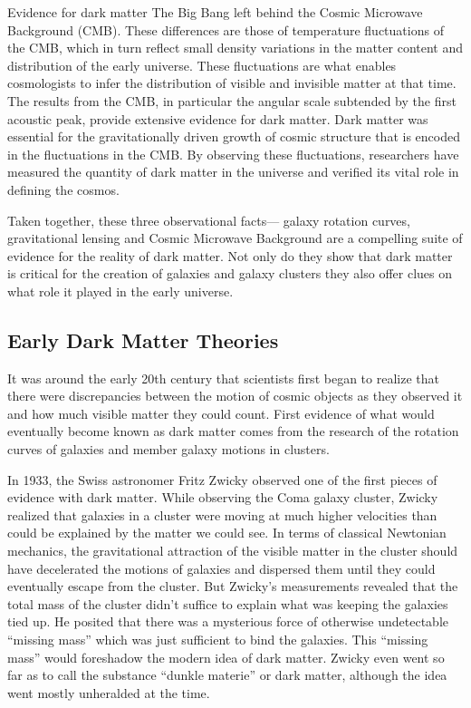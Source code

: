 Evidence for dark matter The Big Bang left behind the Cosmic Microwave Background (CMB). These differences are those of temperature fluctuations of the CMB, which in turn reflect small density variations in the matter content and distribution of the early universe. These fluctuations are what enables cosmologists to infer the distribution of visible and invisible matter at that time. The results from the CMB, in particular the angular scale subtended by the first acoustic peak, provide extensive evidence for dark matter. Dark matter was essential for the gravitationally driven growth of cosmic structure that is encoded in the fluctuations in the CMB. By observing these fluctuations, researchers have measured the quantity of dark matter in the universe and verified its vital role in defining the cosmos.

Taken together, these three observational facts— galaxy rotation curves, gravitational lensing and Cosmic Microwave Background are a compelling suite of evidence for the reality of dark matter. Not only do they show that dark matter is critical for the creation of galaxies and galaxy clusters they also offer clues on what role it played in the early universe.

 

\subsection{Early Dark Matter Theories } 


It was around the early 20th century that scientists first began to realize that there were discrepancies between the motion of cosmic objects as they observed it and how much visible matter they could count. First evidence of what would eventually become known as dark matter comes from the research of the rotation curves of galaxies and member galaxy motions in clusters.

In 1933, the Swiss astronomer Fritz Zwicky observed one of the first pieces of evidence with dark matter. While observing the Coma galaxy cluster, Zwicky realized that galaxies in a cluster were moving at much higher velocities than could be explained by the matter we could see.\cite{zwicky1933} In terms of classical Newtonian mechanics, the gravitational attraction of the visible matter in the cluster should have decelerated the motions of galaxies and dispersed them until they could eventually escape from the cluster. But Zwicky’s measurements revealed that the total mass of the cluster didn’t suffice to explain what was keeping the galaxies tied up. He posited that there was a mysterious force of otherwise undetectable “missing mass” which was just sufficient to bind the galaxies. This “missing mass” would foreshadow the modern idea of dark matter. Zwicky even went so far as to call the substance “dunkle materie” or dark matter, although the idea went mostly unheralded at the time.\cite{zwicky1933}

